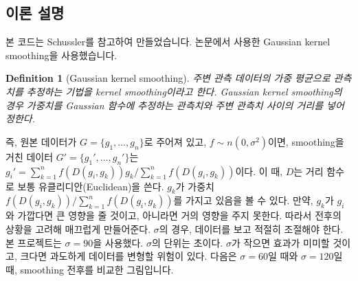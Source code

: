 \documentclass{oblivoir}
\newtheorem{definition}{Definition}
\begin{document}
  \subsection{이론 설명}
  본 코드는 Schussler\cite{Schussler}를 참고하여 만들었습니다. 논문에서 사용한 Gaussian kernel smoothing을 사용했습니다.
  \begin{definition}[Gaussian kernel smoothing]
    주변 관측 데이터의 가중 평균으로 관측치를 추정하는 기법을 kernel smoothing이라고 한다.
    Gaussian kernel smoothing의 경우 가중치를 Gaussian 함수에 추정하는 관측치와 주변 관측치 사이의 거리를 넣어 정한다. 
  \end{definition}
  즉, 원본 데이터가 $G=\{g_1,\ldots,g_n\}$로 주어져 있고, $f\sim n(0,\sigma^2)$이면,
  smoothing을 거친 데이터 $G'=\{g_1',\ldots,g_n'\}$는 $g_i'=\sum_{k=1}^n{f(D(g_i,g_k))g_k}/\sum_{k=1}^n{f(D(g_i,g_k))}$이다.
  이 때, $D$는 거리 함수로 보통 유클리디안(Euclidean)을 쓴다. $g_k$가 가중치 $f(D(g_i,g_k))/\sum_{k=1}^n{f(D(g_i,g_k))}$를 가지고 있음을 볼 수 있다.
  만약, $g_k$가 $g_i$와 가깝다면 큰 영향을 줄 것이고, 아니라면 거의 영향을 주지 못한다. 따라서 전후의 상황을 고려해 매끄럽게 만들어준다.\newline
  $\sigma$의 경우, 데이터를 보고 적절히 조절해야 한다. 본 프로젝트는 $\sigma=90$을 사용했다. $\sigma$의 단위는 초이다.
  $\sigma$가 작으면 효과가 미미할 것이고, 크다면 과도하게 데이터를 변형할 위험이 있다.
  다음은 $\sigma=60$일 때와 $\sigma=120$일 때, smoothing 전후를 비교한 그림입니다.
\end{document}
